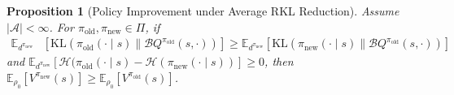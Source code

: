 \documentclass[twoside,11pt]{article}
\newcommand{\Ex}{\mathbb{E}}
\newcommand{\actionspace}{\mathcal{A}}
\newcommand{\KL}{\mathrm{KL}}
\newcommand{\boltzmannQ}{\mathcal{B}Q}
\newcommand{\entropy}{\mathcal{H}}
\newcommand{\pinew}{{\pi_\mathrm{new}}}
\newcommand{\piold}{{\pi_\mathrm{old}}}
\newtheorem{proposition}{Proposition}
\begin{document}
\begin{proposition}[Policy Improvement under Average RKL Reduction]\label{prop:avg-reverse-kl}
Assume $|\actionspace| < \infty$. For $\piold, \pinew \in \Pi$, if
\begin{align}\label{eq:avg-rev-kl-policy-assumption}
    \Ex_{d^{\pinew}}&[\KL(\piold(\cdot \mid s) \parallel \boltzmannQ^{\piold}(s, \cdot))] \geq \Ex_{d^{\pinew}}[\KL(\pinew(\cdot \mid s) \parallel \boltzmannQ^{\piold}(s, \cdot))] \nonumber
\end{align}
and $\Ex_{d^{\pinew}}[\entropy(\piold(\cdot \mid s) - \entropy(\pinew(\cdot \mid s))] \geq 0$, then $\Ex_{\rho_0}[V^{\pinew}(s)] \geq \Ex_{\rho_0}[V^{\piold}(s)]$.
%
\end{proposition}
\end{document}
